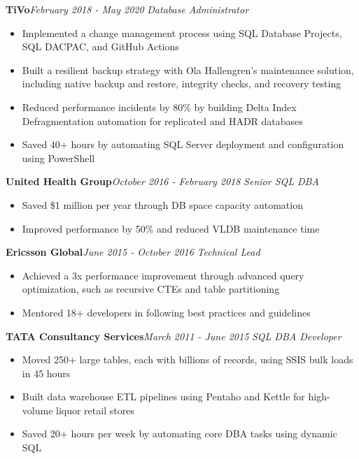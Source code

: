 \documentclass[10pt,a4paper]{article}
\begin{document}
\vspace{14.7pt}
\noindent\textbf{TiVo}\hfill \textit{February 2018 - May 2020}
\textit{Database Administrator}\\[-5pt]
\begin{itemize}
  \item Implemented a change management process using SQL Database Projects, SQL DACPAC, and GitHub Actions
  \item Built a resilient backup strategy with Ola Hallengren's maintenance solution, including native backup and restore, integrity checks, and recovery testing
  \item Reduced performance incidents by 80\% by building Delta Index Defragmentation automation for replicated and HADR databases
  \item Saved 40+ hours by automating SQL Server deployment and configuration using PowerShell
\end{itemize}
\vspace{14.7pt}
\noindent\textbf{United Health Group}\hfill \textit{October 2016 - February 2018}
\textit{Senior SQL DBA}\\[-5pt]
\begin{itemize}
  \item Saved \$1 million per year through DB space capacity automation
  \item Improved performance by 50\% and reduced VLDB maintenance time
\end{itemize}
\vspace{14.7pt}
\noindent\textbf{Ericsson Global}\hfill \textit{June 2015 - October 2016}
\textit{Technical Lead}\\[-5pt]
\begin{itemize}
  \item Achieved a 3x performance improvement through advanced query optimization, such as recursive CTEs and table partitioning
  \item Mentored 18+ developers in following best practices and guidelines
\end{itemize}
\vspace{14.7pt}
\noindent\textbf{TATA Consultancy Services}\hfill \textit{March 2011 - June 2015}
\textit{SQL DBA Developer}\\[-5pt]
\begin{itemize}
  \item Moved 250+ large tables, each with billions of records, using SSIS bulk loads in 45 hours
  \item Built data warehouse ETL pipelines using Pentaho and Kettle for high-volume liquor retail stores
  \item Saved 20+ hours per week by automating core DBA tasks using dynamic SQL
\end{itemize}
\end{document}
